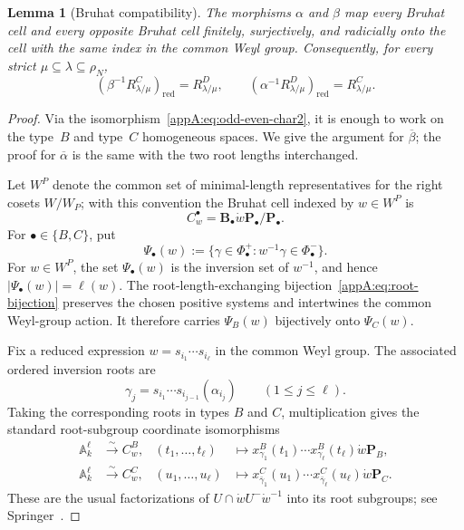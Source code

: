 \documentclass[11pt,a4paper,oneside]{amsart}
\numberwithin{equation}{section}
\newtheorem{lemma}[theorem]{Lemma}
\theoremstyle{definition}
\theoremstyle{remark}
\begin{document}
\begin{lemma}[Bruhat compatibility]
\label{appA:lem:Bruhat-compatibility}
The morphisms $\alpha$ and $\beta$ map every Bruhat cell and every opposite
Bruhat cell finitely, surjectively, and radicially onto the cell with the same
index in the common Weyl group.  Consequently, for every strict
$\mu\subseteq\lambda\subseteq\rho_N$,
\begin{equation}
\label{appA:eq:reduced-Richardson-preimages}
  (\beta^{-1}R^C_{\lambda/\mu})_{\mathrm{red}}
  =R^D_{\lambda/\mu},
  \qquad
  (\alpha^{-1}R^D_{\lambda/\mu})_{\mathrm{red}}
  =R^C_{\lambda/\mu}.
\end{equation}
\end{lemma}

\begin{proof}
Via the isomorphism~\eqref{appA:eq:odd-even-char2}, it is enough to work on
the type~$B$ and type~$C$ homogeneous spaces.  We give the argument for
$\overline\beta$; the proof for $\overline\alpha$ is the same with the two
root lengths interchanged.

Let $W^P$ denote the common set of minimal-length representatives for the
right cosets $W/W_P$; with this convention the Bruhat cell indexed by
$w\in W^P$ is
\[
 C_w^\bullet=\mathbf B_\bullet\dot w\mathbf P_\bullet/
              \mathbf P_\bullet.
\]
For $\bullet\in\{B,C\}$, put
\[
 \Psi_\bullet(w)
 :=\{\gamma\in\Phi_\bullet^+:w^{-1}\gamma\in\Phi_\bullet^-\}.
\]
For $w\in W^P$, the set $\Psi_\bullet(w)$ is the inversion set of
$w^{-1}$, and hence $|\Psi_\bullet(w)|=\ell(w)$.  The
root-length-exchanging bijection~\eqref{appA:eq:root-bijection} preserves
the chosen positive systems and intertwines the common Weyl-group action.
It therefore carries $\Psi_B(w)$ bijectively onto $\Psi_C(w)$.

Fix a reduced expression $w=s_{i_1}\cdots s_{i_\ell}$ in the common Weyl
group.  The associated ordered inversion roots are
\[
 \gamma_j=s_{i_1}\cdots s_{i_{j-1}}(\alpha_{i_j})
 \qquad(1\leq j\leq\ell).
\]
Taking the corresponding roots in types $B$ and $C$, multiplication gives
the standard root-subgroup coordinate isomorphisms
\begin{align}
 \mathbb A_k^\ell
 &\xrightarrow{\sim}C_w^B,
 &(t_1,\ldots,t_\ell)&\longmapsto
   x^B_{\gamma_1}(t_1)\cdots x^B_{\gamma_\ell}(t_\ell)
   \dot w\mathbf P_B,\label{appA:eq:cell-coordinates-B}\\
 \mathbb A_k^\ell
 &\xrightarrow{\sim}C_w^C,
 &(u_1,\ldots,u_\ell)&\longmapsto
   x^C_{\bar\gamma_1}(u_1)\cdots x^C_{\bar\gamma_\ell}(u_\ell)
   \dot w\mathbf P_C.
 \label{appA:eq:cell-coordinates-C}
\end{align}
These are the usual factorizations of
$U\cap\dot wU^-\dot w^{-1}$ into its root subgroups; see
Springer~\cite[\S8.3]{Springer98}.


\end{proof}
\end{document}
